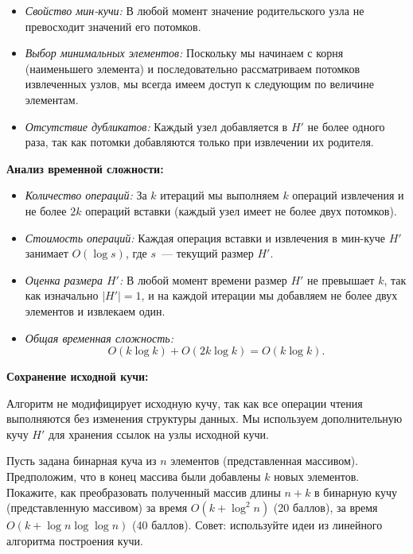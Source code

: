 \documentclass[11pt]{article}
\begin{document}
\begin{solution}
    \begin{itemize}
        \item \textit{Свойство мин-кучи:} В любой момент значение родительского узла не превосходит значений его потомков.
        \item \textit{Выбор минимальных элементов:} Поскольку мы начинаем с корня (наименьшего элемента) и последовательно рассматриваем потомков извлеченных узлов, мы всегда имеем доступ к следующим по величине элементам.
        \item \textit{Отсутствие дубликатов:} Каждый узел добавляется в $H'$ не более одного раза, так как потомки добавляются только при извлечении их родителя.
    \end{itemize}

    \textbf{Анализ временной сложности:}

    \begin{itemize}
        \item \textit{Количество операций:} За $k$ итераций мы выполняем $k$ операций извлечения и не более $2k$ операций вставки (каждый узел имеет не более двух потомков).
        \item \textit{Стоимость операций:} Каждая операция вставки и извлечения в мин-куче $H'$ занимает $O(\log s)$, где $s$~--- текущий размер $H'$.
        \item \textit{Оценка размера $H'$:} В любой момент времени размер $H'$ не превышает $k$, так как изначально $|H'| = 1$, и на каждой итерации мы добавляем не более двух элементов и извлекаем один.
        \item \textit{Общая временная сложность:}
              \[
                  O(k \log k) + O(2k \log k) = O(k \log k).
              \]
    \end{itemize}

    \textbf{Сохранение исходной кучи:}

    Алгоритм не модифицирует исходную кучу, так как все операции чтения выполняются без изменения структуры данных. Мы используем дополнительную кучу $H'$ для хранения ссылок на узлы исходной кучи.
\end{solution}

\begin{problem}{40}
Пусть задана бинарная куча из $n$ элементов (представленная массивом). Предположим, что в конец массива были добавлены $k$ новых элементов.
Покажите, как преобразовать полученный массив длины $n + k$ в бинарную кучу (представленную массивом) за время $O(k + \log^2 n)$ (20 баллов), за время $O(k + \log n \log \log n)$ (40 баллов).
Совет: используйте идеи из линейного алгоритма построения кучи.
\end{problem}
\end{document}
